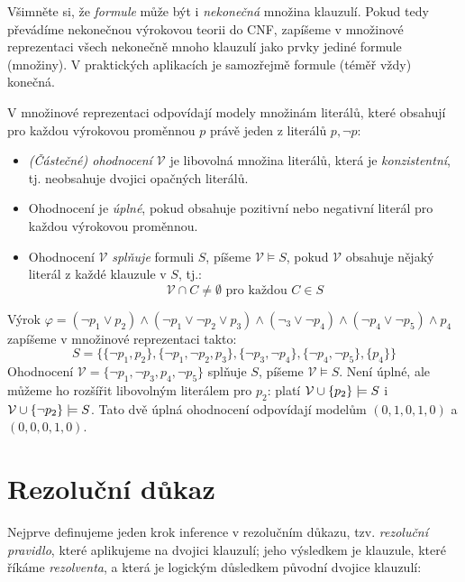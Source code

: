 \begin{remark}
    Všimněte si, že \emph{formule} může být i \emph{nekonečná} množina klauzulí. Pokud tedy převádíme nekonečnou výrokovou teorii do CNF, zapíšeme v množinové reprezentaci všech nekonečně mnoho klauzulí jako prvky jediné formule (množiny). V praktických aplikacích je samozřejmě formule (téměř vždy) konečná.
\end{remark}

V množinové reprezentaci odpovídají modely množinám literálů, které obsahují pro každou výrokovou proměnnou $p$ právě jeden z literálů $p,\neg p$:
\begin{itemize}
    \item \emph{(Částečné) ohodnocení $\mathcal V$} je libovolná množina literálů, která je \emph{konzistentní}, tj. neobsahuje dvojici opačných literálů. 
    \item Ohodnocení je \emph{úplné}, pokud obsahuje pozitivní nebo negativní literál pro každou výrokovou proměnnou.
    \item Ohodnocení $\mathcal V$ \emph{splňuje} formuli $S$, píšeme $\mathcal V\models S$, pokud $\mathcal V$ obsahuje nějaký literál z každé klauzule v $S$, tj.:
    $$
    \mathcal V\cap C\neq\emptyset\text{ pro každou }C\in S
    $$
\end{itemize}

\begin{example}\label{example:set-representation}
    Výrok $\varphi=(\neg p_1\lor p_2)\land(\neg p_1\lor\neg p_2\lor p_3)\land(\neg _3\lor\neg p_4)\land(\neg p_4\lor \neg p_5)\land p_4$ zapíšeme v množinové reprezentaci takto:
    $$
    S=\{\{\neg p_1,p_2\},\{\neg p_1,\neg p_2,p_3\},\{\neg p_3,\neg p_4\},\{\neg p_4,\neg p_5\},\{p_4\}\}
    $$
    Ohodnocení $\mathcal V=\{\neg p_1,\neg p_3,p_4,\neg p_5\}$ splňuje $S$, píšeme $\mathcal V\models S$. Není úplné, ale můžeme ho rozšířit libovolným literálem pro $p_2$: platí $\mathcal V\mathbin{\cup}\{p_2\}\models S$ i $\mathcal V\mathbin{\cup}\{\neg p_2\}\models S$. Tato dvě úplná ohodnocení odpovídají modelům $(0,1,0,1,0)$ a $(0,0,0,1,0)$.
\end{example}


\section{Rezoluční důkaz}

Nejprve definujeme jeden krok inference v rezolučním důkazu, tzv. \emph{rezoluční pravidlo}, které aplikujeme na dvojici klauzulí; jeho výsledkem je klauzule, které říkáme \emph{rezolventa}, a která je logickým důsledkem původní dvojice klauzulí:


